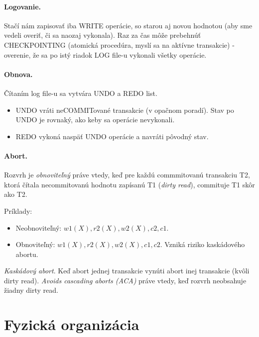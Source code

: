 \documentclass[10pt,a4paper]{article}
\begin{document}
\paragraph{Logovanie.}
Stačí nám zapisovať iba WRITE operácie, so starou aj novou hodnotou (aby sme vedeli overiť, či sa naozaj vykonala).
Raz za čas môže prebehnúť CHECKPOINTING (atomická procedúra, myslí sa na aktívne transakcie) - overenie, že sa po istý riadok LOG file-u vykonali všetky operácie.  

\paragraph{Obnova.}
Čítaním log file-u sa vytvára UNDO a REDO list.

\begin{itemize}
\item UNDO vráti neCOMMITované transakcie (v opačnom poradí). Stav po UNDO je rovnaký, ako keby sa operácie nevykonali.  
\item REDO vykoná naspäť UNDO operácie a navráti pôvodný stav. 
\end{itemize}

\paragraph{Abort.}
Rozvrh je \emph{obnoviteľný} práve vtedy, keď pre každú commmitovanú transakciu T2, ktorá čítala necommitovanú hodnotu zapísanú T1 (\emph{dirty read}), commituje T1 skôr ako T2. 

Príklady: 
\begin{itemize}
\item Neobnoviteľný: $w1(X), r2(X), w2(X), c2, c1$.  
\item Obnoviteľný: $w1(X), r2(X), w2(X), c1, c2$. Vzniká riziko kaskádového abortu. 
\end{itemize}

\emph{Kaskádový abort}. Keď abort jednej transakcie vynúti abort inej transakcie (kvôli dirty read).
\emph{Avoids cascading aborts (ACA)} práve vtedy, keď rozvrh neobsahuje žiadny dirty read. 
    

\section{Fyzická organizácia} 
\label{fyzicka_organizacia}
\end{document}
